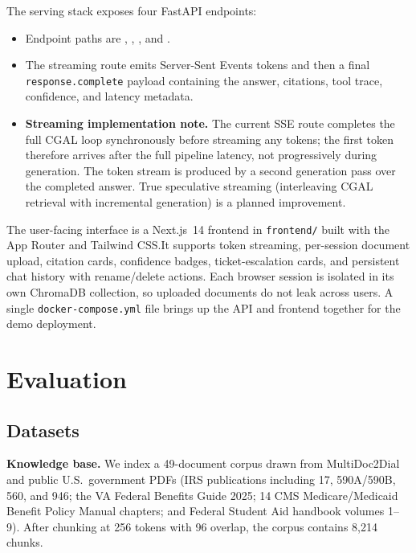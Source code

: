 \documentclass[11pt,a4paper,twocolumn]{article}
\begin{document}
The serving stack exposes four FastAPI endpoints:
\begin{itemize}
\item Endpoint paths are , , , and .
\item The streaming route emits Server-Sent Events tokens and then a final
      \texttt{response.complete} payload containing the answer, citations,
      tool trace, confidence, and latency metadata.
\item \textbf{Streaming implementation note.} The current SSE route
      completes the full CGAL loop synchronously before streaming any
      tokens; the first token therefore arrives after the full pipeline
      latency, not progressively during generation. The token stream is
      produced by a second generation pass over the completed answer.
      True speculative streaming (interleaving CGAL retrieval with
      incremental generation) is a planned improvement.
\end{itemize}
The user-facing interface is a Next.js~14 frontend in \texttt{frontend/}
built with the App Router and Tailwind CSS.\@ It supports token streaming,
per-session document upload, citation cards, confidence badges,
ticket-escalation cards, and persistent chat history with rename/delete
actions. Each browser session is isolated in its own ChromaDB collection,
so uploaded documents do not leak across users. A single
\texttt{docker-compose.yml} file brings up the API and frontend together
for the demo deployment.

\section{Evaluation}\label{sec:eval}

\subsection{Datasets}

\textbf{Knowledge base.} We index a 49-document corpus drawn from
MultiDoc2Dial~\cite{multidoc2dial} and public U.S.\ government PDFs
(IRS publications including 17, 590A/590B, 560, and 946; the VA Federal
Benefits Guide 2025; 14 CMS Medicare/Medicaid Benefit Policy Manual
chapters; and Federal Student Aid handbook volumes 1--9). After
chunking at 256 tokens with 96 overlap, the corpus contains 8{,}214
chunks.
\end{document}
